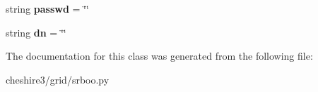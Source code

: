 \begin{DoxyCompactItemize}
\item 
\hypertarget{classcheshire3_1_1grid_1_1srboo_1_1_srb_connection_a11206bf541348ae228864c2f89db9a62}{string {\bfseries passwd} = \char`\"{}\char`\"{}}\label{classcheshire3_1_1grid_1_1srboo_1_1_srb_connection_a11206bf541348ae228864c2f89db9a62}

\item 
\hypertarget{classcheshire3_1_1grid_1_1srboo_1_1_srb_connection_a2502288b074fc27a20c8d4cdaa789ae0}{string {\bfseries dn} = \char`\"{}\char`\"{}}\label{classcheshire3_1_1grid_1_1srboo_1_1_srb_connection_a2502288b074fc27a20c8d4cdaa789ae0}

\end{DoxyCompactItemize}


The documentation for this class was generated from the following file\-:\begin{DoxyCompactItemize}
\item 
cheshire3/grid/srboo.\-py\end{DoxyCompactItemize}
